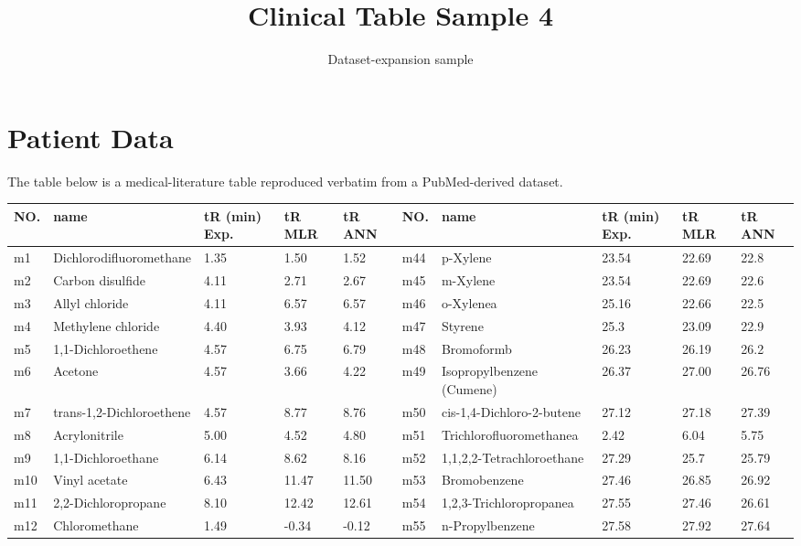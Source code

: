 \documentclass[11pt]{article}
\title{Clinical Table Sample 4}
\author{Dataset-expansion sample}
\date{}
\begin{document}
\maketitle
\section{Patient Data}
The table below is a medical-literature table reproduced verbatim from a PubMed-derived dataset.

\begin{table}
\begin{tabular}{|l|l|l|l|l|l|l|l|l|l|}
\hline
\textbf{\textbf{NO.}} & \textbf{\textbf{name}} & \textbf{\textbf{tR (min) Exp.}} & \textbf{\textbf{tR MLR}} & \textbf{\textbf{tR ANN}} & \textbf{\textbf{NO.}} & \textbf{\textbf{name}} & \textbf{\textbf{tR (min) Exp.}} & \textbf{\textbf{tR MLR}} & \textbf{\textbf{tR ANN}} \\
\hline
m1 & Dichlorodifluoromethane & 1.35 & 1.50 & 1.52 & m44 & p-Xylene & 23.54 & 22.69 & 22.8 \\
\hline
m2 & Carbon disulfide & 4.11 & 2.71 & 2.67 & m45 & m-Xylene & 23.54 & 22.69 & 22.6 \\
\hline
m3 & Allyl chloride & 4.11 & 6.57 & 6.57 & m46 & o-Xylenea & 25.16 & 22.66 & 22.5 \\
\hline
m4 & Methylene chloride & 4.40 & 3.93 & 4.12 & m47 & Styrene & 25.3 & 23.09 & 22.9 \\
\hline
m5 & 1,1-Dichloroethene & 4.57 & 6.75 & 6.79 & m48 & Bromoformb & 26.23 & 26.19 & 26.2 \\
\hline
m6 & Acetone & 4.57 & 3.66 & 4.22 & m49 & Isopropylbenzene (Cumene) & 26.37 & 27.00 & 26.76 \\
\hline
m7 & trans-1,2-Dichloroethene & 4.57 & 8.77 & 8.76 & m50 & cis-1,4-Dichloro-2-butene & 27.12 & 27.18 & 27.39 \\
\hline
m8 & Acrylonitrile & 5.00 & 4.52 & 4.80 & m51 & Trichlorofluoromethanea & 2.42 & 6.04 & 5.75 \\
\hline
m9 & 1,1-Dichloroethane & 6.14 & 8.62 & 8.16 & m52 & 1,1,2,2-Tetrachloroethane & 27.29 & 25.7 & 25.79 \\
\hline
m10 & Vinyl acetate & 6.43 & 11.47 & 11.50 & m53 & Bromobenzene & 27.46 & 26.85 & 26.92 \\
\hline
m11 & 2,2-Dichloropropane & 8.10 & 12.42 & 12.61 & m54 & 1,2,3-Trichloropropanea & 27.55 & 27.46 & 26.61 \\
\hline
m12 & Chloromethane & 1.49 & -0.34 & -0.12 & m55 & n-Propylbenzene & 27.58 & 27.92 & 27.64 \\

\end{tabular}
\end{table}
\end{document}
